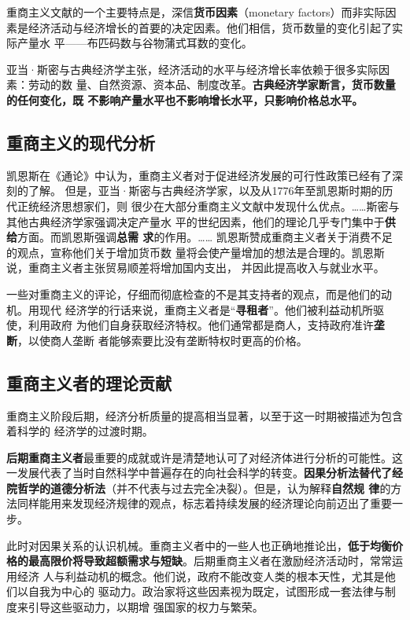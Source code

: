 重商主义文献的一个主要特点是，深信\textbf{货币因素}（monetary factors）而非实际因
素是经济活动与经济增长的首要的决定因素。他们相信，货币数量的变化引起了实际产量水
平——布匹码数与谷物蒲式耳数的变化。

亚当·斯密与古典经济学主张，经济活动的水平与经济增长率依赖于很多实际因素：劳动的数
量、自然资源、资本品、制度改革。\textbf{古典经济学家断言，货币数量的任何变化，既
  不影响产量水平也不影响增长水平，只影响价格总水平。}

\subsection{重商主义的现代分析}

凯恩斯在《通论》中认为，重商主义者对于促进经济发展的可行性政策已经有了深刻的了解。
但是，亚当·斯密与古典经济学家，以及从1776年至凯恩斯时期的历代正统经济思想家们，则
很少在大部分重商主义文献中发现什么优点。……斯密与其他古典经济学家强调决定产量水
平的世纪因素，他们的理论几乎专门集中于\textbf{供给}方面。而凯恩斯强调\textbf{总需
  求}的作用。…… 凯恩斯赞成重商主义者关于消费不足的观点，宣称他们关于增加货币数
量将会使产量增加的想法是合理的。凯恩斯说，重商主义者主张贸易顺差将增加国内支出，
并因此提高收入与就业水平。

一些对重商主义的评论，仔细而彻底检查的不是其支持者的观点，而是他们的动机。用现代
经济学的行话来说，重商主义者是“\textbf{寻租者}”。他们被利益动机所驱使，利用政府
为他们自身获取经济特权。他们通常都是商人，支持政府准许\textbf{垄断}，以使商人垄断
者能够索要比没有垄断特权时更高的价格。


\subsection{重商主义者的理论贡献}

重商主义阶段后期，经济分析质量的提高相当显著，以至于这一时期被描述为包含着科学的
经济学的过渡时期。

\textbf{后期重商主义者}最重要的成就或许是清楚地认可了对经济体进行分析的可能性。这
一发展代表了当时自然科学中普遍存在的向社会科学的转变。\textbf{因果分析法替代了经
  院哲学的道德分析法}（并不代表与过去完全决裂）。但是，认为解释\textbf{自然规
  律}的方法同样能用来发现经济规律的观点，标志着持续发展的经济理论向前迈出了重要一
步。

此时对因果关系的认识机械。重商主义者中的一些人也正确地推论出，\textbf{低于均衡价
  格的最高限价将导致超额需求与短缺}。后期重商主义者在激励经济活动时，常常运用经济
人与利益动机的概念。他们说，政府不能改变人类的根本天性，尤其是他们以自我为中心的
驱动力。政治家将这些因素视为既定，试图形成一套法律与制度来引导这些驱动力，以期增
强国家的权力与繁荣。

